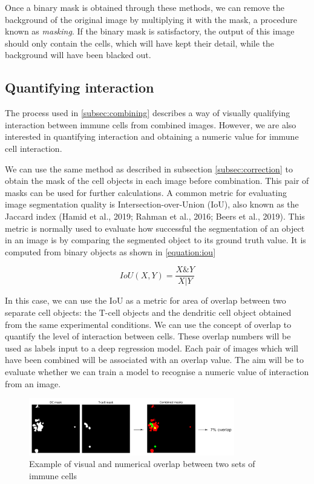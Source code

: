 Once a binary mask is obtained through these methods, we can remove the background of the original image by multiplying it with the mask, a procedure known as \textit{masking}. If the binary mask is satisfactory, the output of this image should only contain the cells, which will have kept their detail, while the background will have been blacked out.

\subsection{Quantifying interaction}

The process used in \autoref{subsec:combining} describes a way of visually qualifying interaction between immune cells from combined images. However, we are also interested in quantifying interaction and obtaining a numeric value for immune cell interaction.

We can use the same method as described in subsection \ref{subsec:correction} to obtain the mask of the cell objects in each image before combination. This pair of masks can be used for further calculations. A common metric for evaluating image segmentation quality is Intersection-over-Union (IoU), also known as the Jaccard index (Hamid et al., 2019; Rahman et al., 2016; Beers et al., 2019). This metric is normally used to evaluate how successful the segmentation of an object in an image is by comparing the segmented object to its ground truth value. It is computed from binary objects as shown in \autoref{equation:iou}

\begin{equation}
    IoU(X,Y) = \frac{X \& Y}{X | Y}
    \label{equation:iou}
\end{equation}

In this case, we can use the IoU as a metric for area of overlap between two separate cell objects: the T-cell objects and the dendritic cell object obtained from the same experimental conditions. We can use the concept of overlap to quantify the level of interaction between cells. These overlap numbers will be used as labels input to a deep regression model. Each pair of images which will have been combined will be associated with an overlap value. The aim will be to evaluate whether we can train a model to recognise a numeric value of interaction from an image.

\begin{figure}
    \centering
    \includegraphics[width=0.8\textwidth]{dissertation/figures/mask_overlap_operation.png}
    \caption{Example of visual and numerical overlap between two sets of immune cells}
    \label{fig:mask_overlap}
\end{figure}

